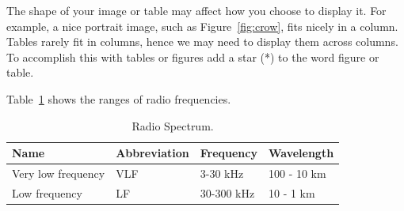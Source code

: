 \documentclass[pdf,bookmarks,colorlinks=true]{IEEEtran}
\begin{document}
The shape of your image or table may affect how you choose to display it. For example, a nice portrait image, such as Figure~\ref{fig:crow}, fits nicely in a column. Tables rarely fit in columns, hence we may need to display them across columns. To accomplish this with tables or figures add a star (*) to the word figure or table. 

Table~\ref{tbl:frequencies} shows the ranges of radio frequencies.

\begin{table}[htb]
    \centering
    \caption{Radio Spectrum.}
    \label{tbl:frequencies}
    \begin{tabular}{|l|l|l|l|}
        \hline
        Name & Abbreviation & Frequency & Wavelength \\
        \hline \hline
        Very low frequency & VLF & 3-30 kHz & 100 - 10 km \\ \hline
        Low frequency & LF & 30-300 kHz & 10 - 1 km \\ \hline
    \end{tabular}
\end{table}
\end{document}
